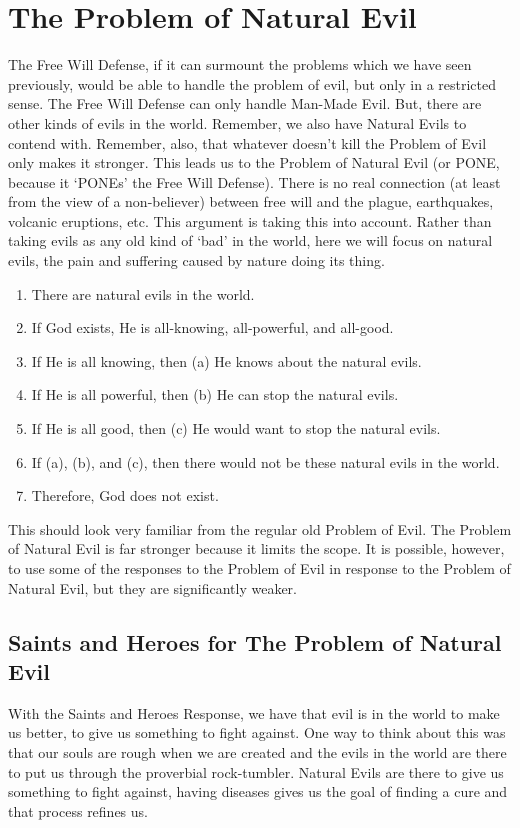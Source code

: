 \section{The Problem of Natural Evil}
The Free Will Defense, if it can surmount the problems which we have seen previously, would be able to handle the problem of evil, but only in a restricted sense. The Free Will Defense can only handle Man-Made Evil. But, there are other kinds of evils in the world. Remember, we also have Natural Evils to contend with. Remember, also, that whatever doesn't kill the Problem of Evil only makes it stronger. This leads us to the Problem of Natural Evil (or PONE, because it `PONEs' the Free Will Defense). There is no real connection (at least from the view of a non-believer) between free will and the plague, earthquakes, volcanic eruptions, etc. This argument is taking this into account. Rather than taking evils as any old kind of `bad' in the world, here we will focus on natural evils, the pain and suffering caused by nature doing its thing. 
\begin{enumerate}
    \item There are natural evils in the world.
    \item If God exists, He is all-knowing, all-powerful, and all-good.
    \item If He is all knowing, then (a) He knows about the natural evils.
    \item If He is all powerful, then (b) He can stop the natural evils.
    \item If He is all good, then (c) He would want to stop the natural evils.
    \item If (a), (b), and (c), then there would not be these natural evils in the world.
    \item Therefore, God does not exist.
\end{enumerate}
This should look very familiar from the regular old Problem of Evil. The Problem of Natural Evil is far stronger because it limits the scope. It is possible, however, to use some of the responses to the Problem of Evil in response to the Problem of Natural Evil, but they are significantly weaker. 

\subsection{Saints and Heroes for The Problem of Natural Evil}

With the Saints and Heroes Response, we have that evil is in the world to make us better, to give us something to fight against. One way to think about this was that our souls are rough when we are created and the evils in the world are there to put us through the proverbial rock-tumbler. Natural Evils are there to give us something to fight against, having diseases gives us the goal of finding a cure and that process refines us. 

